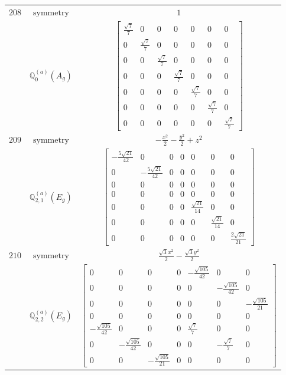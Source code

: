 \documentclass[fleqn,8pt,landscape]{jsarticle}
\begin{document}
\begin{longtable}{ccc}
$ 208 $ & $ \text{symmetry} $ & $ 1 $ \\
$  $ & $ \mathbb{Q}_{0}^{(a)}(A_{g}) $ & $ \begin{bmatrix} \frac{\sqrt{7}}{7} & 0 & 0 & 0 & 0 & 0 & 0 \\ 0 & \frac{\sqrt{7}}{7} & 0 & 0 & 0 & 0 & 0 \\ 0 & 0 & \frac{\sqrt{7}}{7} & 0 & 0 & 0 & 0 \\ 0 & 0 & 0 & \frac{\sqrt{7}}{7} & 0 & 0 & 0 \\ 0 & 0 & 0 & 0 & \frac{\sqrt{7}}{7} & 0 & 0 \\ 0 & 0 & 0 & 0 & 0 & \frac{\sqrt{7}}{7} & 0 \\ 0 & 0 & 0 & 0 & 0 & 0 & \frac{\sqrt{7}}{7} \end{bmatrix} $ \\ \hline
$ 209 $ & $ \text{symmetry} $ & $ - \frac{x^{2}}{2} - \frac{y^{2}}{2} + z^{2} $ \\
$  $ & $ \mathbb{Q}_{2,1}^{(a)}(E_{g}) $ & $ \begin{bmatrix} - \frac{5 \sqrt{21}}{42} & 0 & 0 & 0 & 0 & 0 & 0 \\ 0 & - \frac{5 \sqrt{21}}{42} & 0 & 0 & 0 & 0 & 0 \\ 0 & 0 & 0 & 0 & 0 & 0 & 0 \\ 0 & 0 & 0 & 0 & 0 & 0 & 0 \\ 0 & 0 & 0 & 0 & \frac{\sqrt{21}}{14} & 0 & 0 \\ 0 & 0 & 0 & 0 & 0 & \frac{\sqrt{21}}{14} & 0 \\ 0 & 0 & 0 & 0 & 0 & 0 & \frac{2 \sqrt{21}}{21} \end{bmatrix} $ \\ \hline
$ 210 $ & $ \text{symmetry} $ & $ \frac{\sqrt{3} x^{2}}{2} - \frac{\sqrt{3} y^{2}}{2} $ \\
$  $ & $ \mathbb{Q}_{2,2}^{(a)}(E_{g}) $ & $ \begin{bmatrix} 0 & 0 & 0 & 0 & - \frac{\sqrt{105}}{42} & 0 & 0 \\ 0 & 0 & 0 & 0 & 0 & - \frac{\sqrt{105}}{42} & 0 \\ 0 & 0 & 0 & 0 & 0 & 0 & - \frac{\sqrt{105}}{21} \\ 0 & 0 & 0 & 0 & 0 & 0 & 0 \\ - \frac{\sqrt{105}}{42} & 0 & 0 & 0 & \frac{\sqrt{7}}{7} & 0 & 0 \\ 0 & - \frac{\sqrt{105}}{42} & 0 & 0 & 0 & - \frac{\sqrt{7}}{7} & 0 \\ 0 & 0 & - \frac{\sqrt{105}}{21} & 0 & 0 & 0 & 0 \end{bmatrix} $ \\ \hline

\end{longtable}
\end{document}

